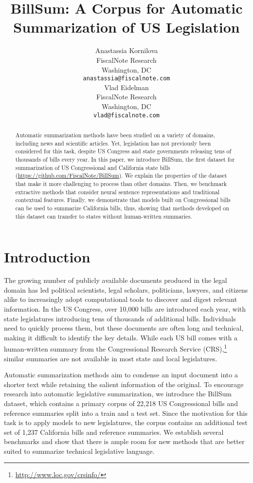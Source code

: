 \documentclass[11pt,a4paper]{article}
\title{BillSum: A Corpus for Automatic Summarization of US Legislation}
\author{Anastassia Kornilova \\
  FiscalNote Research\\
  Washington, DC \\
  {\tt anastassia@fiscalnote.com} \\\And
  Vlad Eidelman \\
  FiscalNote Research\\
  Washington, DC \\
  {\tt vlad@fiscalnote.com} \\}
\date{}
\begin{document}
\maketitle

\begin{abstract}


Automatic summarization methods have been studied on a variety of domains, including news and scientific articles. Yet, legislation has not previously been considered for this task, despite US Congress and state governments releasing tens of thousands of bills every year. In this paper, we introduce BillSum, the first dataset for summarization of US Congressional and California state bills (\url{https://github.com/FiscalNote/BillSum}). We explain the properties of the dataset that make it more challenging to process than other domains. Then, we benchmark extractive methods that consider neural sentence representations and traditional contextual features. Finally, we demonstrate that models built on Congressional bills can be used to summarize California bills, thus, showing that methods developed on this dataset can transfer to states without human-written summaries.

\end{abstract}

\section{Introduction}

The growing number of publicly available documents produced in the legal domain has led political scientists, legal scholars, politicians, lawyers, and citizens alike to increasingly adopt computational tools to discover and digest relevant information. In the US Congress, over 10,000 bills are introduced each year, with state legislatures introducing tens of thousands of additional bills. Individuals need to quickly process them, but these documents are often long and technical, making it difficult to identify the key details.
While each US bill comes with a human-written summary from the Congressional Research Service (CRS),\footnote{\url{http://www.loc.gov/crsinfo/}} similar summaries are not available in most state and local legislatures. 

Automatic summarization methods aim to condense an input document into a shorter text while retaining the salient information of the original. To encourage research into automatic legislative summarization, we introduce the BillSum dataset, which contains a primary corpus of 22,218 US Congressional bills and reference summaries split into a train and a test set. Since the motivation for this task is to apply models to new legislatures, the corpus contains an additional test set of 1,237 California bills and reference summaries. We establish several benchmarks and show that there is ample room for new methods that are better suited to summarize technical legislative language.
\end{document}
